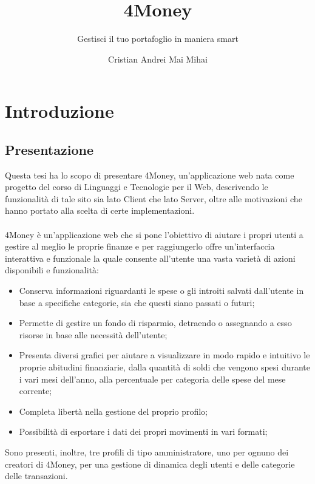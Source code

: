 \documentclass[binding=0.6cm, oneside, noexaminfo, italian]{sapthesis}
\title{4Money}
\subtitle{Gestisci il tuo portafoglio in maniera smart}
\author{Cristian Andrei Mai Mihai}
\newcommand\blankpage{%
    \null
    \thispagestyle{empty}%
    \addtocounter{page}{-1}%
    \newpage}
\begin{document}
\frontmatter
\maketitle

\afterpage{\blankpage}

\newpage

\tableofcontents

\mainmatter
\newpage

\section{Introduzione}
\subsection{Presentazione}
Questa tesi ha lo scopo di presentare 4Money, un’applicazione web nata come progetto del corso di Linguaggi e Tecnologie per il Web, descrivendo le funzionalità di tale sito sia lato Client che lato Server, oltre alle motivazioni che hanno portato alla scelta di certe implementazioni. \\ \\
4Money è un’applicazione web che si pone l’obiettivo di aiutare i propri utenti a gestire al meglio le proprie finanze e per raggiungerlo offre un’interfaccia interattiva e funzionale la quale consente all’utente una vasta varietà di azioni disponibili e funzionalità:
\begin{itemize}
    \item Conserva informazioni riguardanti le spese o gli introiti salvati dall’utente in base a specifiche categorie, sia che questi siano passati o futuri;
    \item Permette di gestire un fondo di risparmio, detraendo o assegnando a esso risorse in base alle necessità dell’utente;
    \item Presenta diversi grafici per aiutare a visualizzare in modo rapido e intuitivo le proprie abitudini finanziarie, dalla quantità di soldi che vengono spesi durante i vari mesi dell’anno, alla percentuale per categoria delle spese del mese corrente;
    \item Completa libertà nella gestione del proprio profilo;
    \item Possibilità di esportare i dati dei propri movimenti in vari formati; 
\end{itemize}
Sono presenti, inoltre, tre profili di tipo amministratore, uno per ognuno dei creatori di 4Money, per una gestione di dinamica degli utenti e delle categorie delle transazioni.
\end{document}
